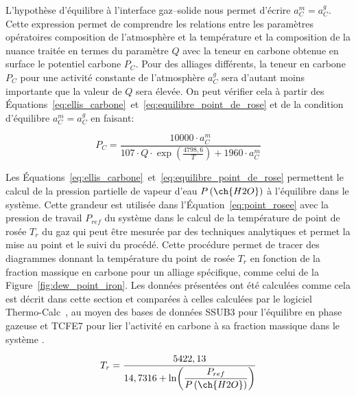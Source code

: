 L'hypothèse d'équilibre à l'interface gaz--solide nous permet d'écrire $a_{C}^{m}=a_{C}^{g}$. Cette expression  permet de comprendre les relations entre les paramètres opératoires \textendash{} composition de l'atmosphère et la température \textendash{} et la composition de la nuance traitée \textendash{} en termes du paramètre $Q$ \textendash{} avec la teneur en carbone obtenue en surface \textemdash{} le potentiel carbone $P_{C}$. Pour des alliages différents, la teneur en carbone $P_{C}$ \textendash{} pour une activité constante de l'atmosphère $a_{C}^{g}$ \textendash{} sera d'autant moins importante que la valeur de $Q$ sera élevée. On peut vérifier cela à partir des Équations~\ref{eq:ellis_carbone}~et~\ref{eq:equilibre_point_de_rose} et de la condition d'équilibre $a_{C}^{m}=a_{C}^{g}$ en faisant:

$$
P_{C}=\frac{10000\cdotp{}a_{C}^{m}}{107\cdotp{}Q\cdotp{}{\exp\left(\frac{4798,6}{T}\right)}+1960\cdotp{} a_{C}^{m}}
$$ 

Les Équations~\ref{eq:ellis_carbone}~et~\ref{eq:equilibre_point_de_rose} permettent le calcul de la pression partielle de vapeur d'eau $P\left(\ch{H2O}\right)$ à l'équilibre dans le système. Cette grandeur est utilisée dans l'Équation~\ref{eq:point_rosee} avec la pression de travail $P_{ref}$ du système dans le calcul de la température de point de rosée $T_{r}$ du gaz qui peut être mesurée par des techniques analytiques et permet la mise au point et le suivi du procédé. Cette procédure permet de tracer des diagrammes donnant la température du point de rosée $T_{r}$ en fonction de la fraction massique en carbone pour un alliage spécifique, comme celui de la Figure~\ref{fig:dew_point_iron}.  Les données présentées ont été calculées comme cela est décrit dans cette section et comparées à celles calculées par le logiciel Thermo-Calc~\cite{Andersson2002,Borgenstam2000}, au moyen des bases de données SSUB3 pour l'équilibre en phase gazeuse et TCFE7 pour lier l'activité en carbone à sa fraction massique dans le système . 

\begin{equation}
T_{r}=\frac{5422,13}{14,7316+\ln\biggr(\dfrac{P_{ref}}{P\left(\ch{H2O}\right)}\biggr)}
\label{eq:point_rosee}
\end{equation}

